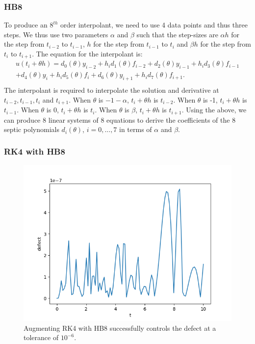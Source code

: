 \documentclass{beamer}
\begin{document}
\begin{frame}
\frametitle{HB8}
To produce an $8^{th}$ order interpolant, we need to use 4 data points and thus three steps. We thus use two parameters $\alpha$ and $\beta$ such that the step-sizes are $\alpha h$ for the step from $t_{i-2}$ to $t_{i - 1}$, $h$ for the step from $t_{i-1}$ to $t_i$ and $\beta h$ for the step from $t_i$ to $t_{i + 1}$.
The equation for the interpolant is:
\begin{equation}
\begin{split}
u(t_i + \theta h) = d_{0}(\theta)y_{i-2} +  h_id_{1}(\theta)f_{i-2} 
+ d_{2}(\theta)y_{i-1}     +  h_id_{3}(\theta)f_{i-1} \\
+ d_{4}(\theta)y_i     +  h_id_{5}(\theta)f_i 
+ d_{6}(\theta)y_{i + 1} + h_id_{7}(\theta)f_{i + 1}. \\
\end{split}
\end{equation}
The interpolant is required to interpolate the solution and derivative at $t_{i-2}, t_{i-1}, t_i$ and $t_{i + 1}$.
When $\theta$ is $-1-\alpha$, $t_i + \theta h$ is $t_{i-2}$.
When $\theta$ is -1, $t_i + \theta h$ is $t_{i-1}$.
When $\theta$ is 0, $t_i + \theta h$ is $t_{i}$.
When $\theta$ is $\beta$, $t_i + \theta h$ is $t_{i + 1}$. 
Using the above, we can produce 8 linear systems of 8 equations to derive the coefficients of the 8 septic polynomials $d_i(\theta)$, $i=0, ..., 7$ in terms of $\alpha$ and $\beta$.
\end{frame}

\begin{frame}
\frametitle{RK4 with HB8}
\begin{figure}[H]
    \centering
    \includegraphics[width=0.7\linewidth]{./figures/rk4_with_hb8_p1_global_defect}
    \caption{Augmenting RK4 with HB8 successfully controls the defect at a tolerance of $10^{-6}$.}
    \label{fig:rk4_with_hb8_p1_global_defect}
\end{figure}
\end{frame}
\end{document}
